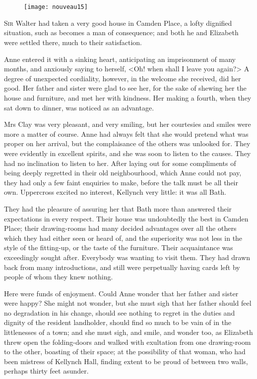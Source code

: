 \chapter[Chapter \thechapter]{}

\begin{figure}[t!]
\centering
\texttt{[image: nouveau15]}
\end{figure}

\lettrine[lraise=0.3]{S}{ir} Walter had taken a very good house in Camden Place, a lofty dignified situation, such as becomes a man of consequence; and both he and Elizabeth were settled there, much to their satisfaction.

Anne entered it with a sinking heart, anticipating an imprisonment of many months, and anxiously saying to herself, <Oh! when shall I leave you again?> A degree of unexpected cordiality, however, in the welcome she received, did her good. Her father and sister were glad to see her, for the sake of shewing her the house and furniture, and met her with kindness. Her making a fourth, when they sat down to dinner, was noticed as an advantage.

Mrs Clay was very pleasant, and very smiling, but her courtesies and smiles were more a matter of course. Anne had always felt that she would pretend what was proper on her arrival, but the complaisance of the others was unlooked for. They were evidently in excellent spirits, and she was soon to listen to the causes. They had no inclination to listen to her. After laying out for some compliments of being deeply regretted in their old neighbourhood, which Anne could not pay, they had only a few faint enquiries to make, before the talk must be all their own. Uppercross excited no interest, Kellynch very little: it was all Bath.

They had the pleasure of assuring her that Bath more than answered their expectations in every respect. Their house was undoubtedly the best in Camden Place; their drawing-rooms had many decided advantages over all the others which they had either seen or heard of, and the superiority was not less in the style of the fitting-up, or the taste of the furniture. Their acquaintance was exceedingly sought after. Everybody was wanting to visit them. They had drawn back from many introductions, and still were perpetually having cards left by people of whom they knew nothing.

Here were funds of enjoyment. Could Anne wonder that her father and sister were happy? She might not wonder, but she must sigh that her father should feel no degradation in his change, should see nothing to regret in the duties and dignity of the resident landholder, should find so much to be vain of in the littlenesses of a town; and she must sigh, and smile, and wonder too, as Elizabeth threw open the folding-doors and walked with exultation from one drawing-room to the other, boasting of their space; at the possibility of that woman, who had been mistress of Kellynch Hall, finding extent to be proud of between two walls, perhaps thirty feet asunder.

